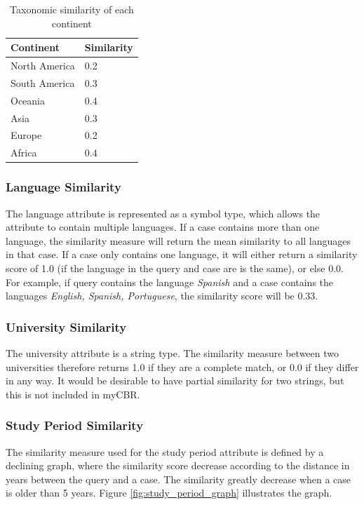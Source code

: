 \begin{table}[h]
\centering
\caption{Taxonomic similarity of each continent}
\label{tab:continent_similarity}
\begin{tabulary}{\textwidth}{|L|L|}
\hline
\textbf{Continent} & \textbf{Similarity} \\ \hline \hline
North America & 0.2 \\ \hline
South America & 0.3 \\ \hline
Oceania & 0.4 \\ \hline
Asia & 0.3 \\ \hline
Europe & 0.2 \\ \hline
Africa & 0.4 \\ \hline
\end{tabulary}
\end{table}
    
\subsubsection{Language Similarity} 

The language attribute is represented as a symbol type, which allows the attribute to contain multiple languages. If a case contains more than one language, the similarity measure will return the mean similarity to all languages in that case. If a case only contains one language, it will either return a similarity score of 1.0 (if the language in the query and case are is the same), or else 0.0. For example, if query contains the language \textit{Spanish} and a case contains the languages \textit{English, Spanish, Portuguese}, the similarity score will be 0.33.
    
\subsubsection{University Similarity} 

The university attribute is a string type. The similarity measure between two universities therefore returns 1.0 if they are a complete match, or 0.0 if they differ in any way. It would be desirable to have partial similarity for two strings, but this is not included in myCBR.
    
\subsubsection{Study Period Similarity} 

The similarity measure used for the study period attribute is defined by a declining graph, where the similarity score decrease according to the distance in years between the query and a case. The similarity greatly decrease when a case is older than 5 years. Figure \ref{fig:study_period_graph} illustrates the graph.
    
